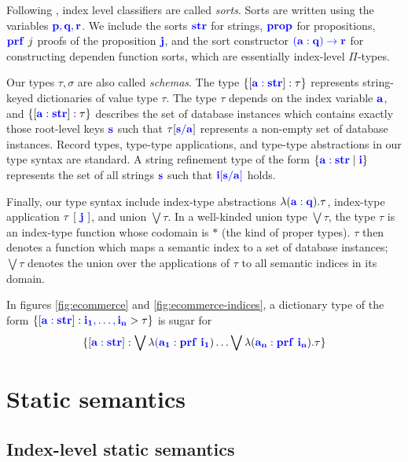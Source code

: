 \documentclass[sigplan,10pt,review,anonymous]{acmart}
\newcommand{\blum}[1]{\mathbf{\color{blue}{#1}}}
\begin{document}
Following \cite{xi2007dependent}, index level classifiers are called \emph{sorts}. Sorts are written using the variables $\blum{p,q,r}$. We include the sorts $\blum{str}$ for strings, $\blum{prop}$ for propositions, $\blum{prf}~j$ proofs of the proposition $\blum{j}$, and the sort constructor $\blum{(a : q) \to r}$ for constructing dependen function sorts, which are essentially index-level $\Pi$-types.

Our types $\tau,\sigma$ are also called \emph{schemas}. The type $\{ [\blum{a : str}] : \tau \}$ represents string-keyed dictionaries of value type $\tau$. The type $\tau$ depends on the index variable $\blum{a}$, and $\{ [\blum{a : str}] : \tau \}$ describes the set of database instances which contains exactly those root-level keys $\blum{s}$ such that $\tau[\blum{s/a}]$ represents a non-empty set of database instances. Record types, type-type applications, and type-type abstractions in our type syntax are standard. A string refinement type of the form $\{ \blum{a : str} \mid \blum{i} \}$ represents the set of all strings $\blum{s}$ such that $\blum{i[s/a]}$ holds.

Finally, our type syntax include index-type abstractions $\lambda (\blum{a : q}). \tau$, index-type application $\tau~[~\blum{j}~]$, and union $\bigvee \tau$. In a well-kinded union type $\bigvee \tau$, the type $\tau$ is an index-type function whose codomain is $\ast$ (the kind of proper types). $\tau$ then denotes a function which maps a semantic index to a set of database instances; $\bigvee \tau$ denotes the union over the applications of $\tau$ to all semantic indices in its domain. 
   
In figures \ref{fig:ecommerce} and \ref{fig:ecommerce-indices}, a dictionary type of the form $\{ [\blum{a :str}] : \blum{i_1, \ldots, i_n} > \tau \}$ is sugar for $$\{ [\blum{a :str}] : \bigvee \lambda \blum{(a_1 : prf~i_1}) \ldots \bigvee \lambda (\blum{a_n : prf~i_n}). \tau \}$$

\section{Static semantics}

\subsection{Index-level static semantics}
\end{document}
